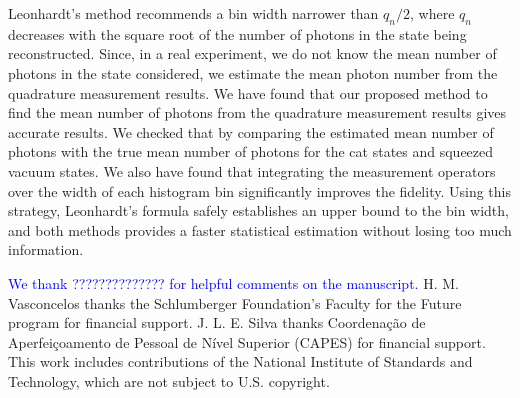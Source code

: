 \documentclass[
reprint,
superscriptaddress,
showpacs,
amsmath,
amssymb,
aps,
pra,
longbibliography
]{revtex4-1}
\providecommand{\editcolor}[2]{\textcolor{#1}{#2}}
\providecommand{\editcolor}[2]{#2}
\newcommand{\HV}[1]{\editcolor{blue}{#1}}
\begin{document}
Leonhardt's method recommends a bin width narrower than $q_n/2$, 
where $q_n$ decreases with the square root of the number
of photons in the state being reconstructed.  Since, in a real
experiment, we do not know the mean number of photons in the state
considered, we estimate the mean photon number from the quadrature
measurement results. We have found that our proposed method to find the 
mean number of photons from the quadrature measurement results gives 
accurate results. We checked that by comparing the estimated mean number 
of photons with the true mean number of photons for the cat states and
squeezed vacuum states. We also have found that integrating the
measurement operators over the width of each histogram bin
significantly improves the fidelity. Using this strategy, Leonhardt's
formula safely establishes an upper bound to the bin width, and both
methods provides a faster statistical estimation without losing too
much information.  



\begin{acknowledgments}
  \HV{We thank ?????????????? for
    helpful comments on the manuscript.}  H. M. Vasconcelos thanks the
  Schlumberger Foundation's Faculty for the Future program for
  financial support. J. L. E. Silva thanks Coordena\c c\~ao de
  Aperfei\c coamento de Pessoal de N\'ivel Superior (CAPES) for
  financial support. This work includes contributions of the National
  Institute of Standards and Technology, which are not subject to
  U.S. copyright.
\end{acknowledgments}




%


\end{document}
